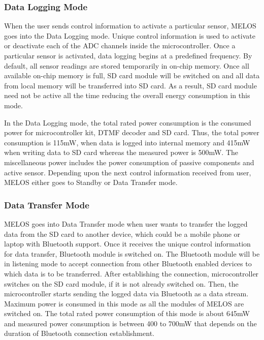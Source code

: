 \documentclass[10pt]{sigplan-proc-varsize}
\newcommand{\melos}{MELOS }
\begin{document}
\subsubsection{Data Logging Mode}
When the user sends control information to activate a particular sensor, \melos goes into the Data Logging mode. Unique control information is used to activate or deactivate each of the ADC channels inside the microcontroller. Once a particular sensor is activated, data logging begins at a predefined frequency. By default, all sensor readings are stored temporarily in on-chip memory. Once all available on-chip memory is full, SD card module will be switched on and all data from local memory will be transferred into SD card. As a result, SD card module need not be active all the time reducing the overall energy consumption in this mode.

In the Data Logging mode, the total rated power consumption is the consumed power for microcontroller kit, DTMF decoder and SD card. Thus, the total power consumption is 115mW, when data is logged into internal memory and 415mW when writing data to SD card whereas the measured power is 500mW. The miscellaneous power includes the power consumption of passive components and active sensor. Depending upon the next control information received from user, \melos either goes to Standby or Data Transfer mode.

\subsubsection{Data Transfer Mode}
\melos goes into Data Transfer mode when user wants to transfer the logged data from the SD card to another device, which could be a mobile phone or laptop with Bluetooth support. Once it receives the unique control information for data transfer, Bluetooth module is switched on. The Bluetooth module will be in listening mode to accept connection from other Bluetooth enabled devices to which data is to be transferred. After establishing the connection, microcontroller switches on the SD card module, if it is not already switched on. Then, the microcontroller starts sending the logged data via Bluetooth as a data stream. Maximum power is consumed in this mode as all the modules of \melos are switched on. The total rated power consumption of this mode is about 645mW and measured power consumption is between 400 to 700mW that depends on the duration of  Bluetooth connection establishment.
\end{document}
